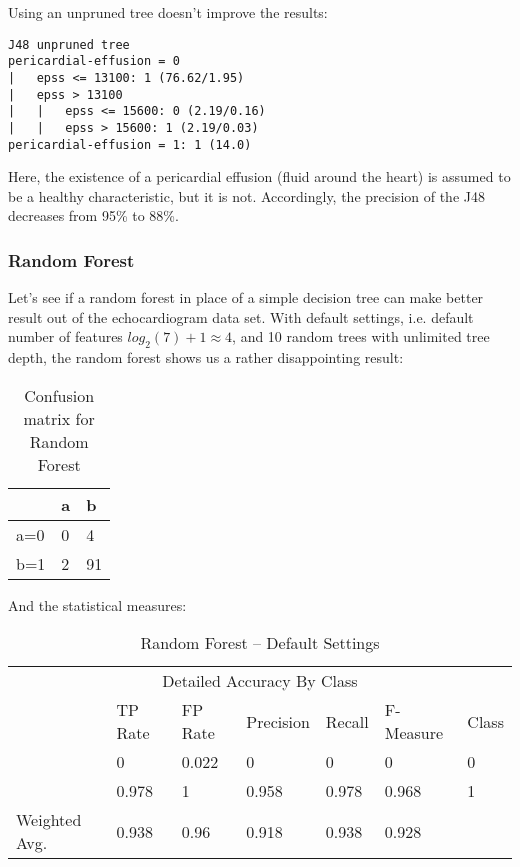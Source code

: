 \documentclass[paper=a4, fontsize=11pt]{scrartcl} %
\numberwithin{equation}{section} %
\numberwithin{figure}{section} %
\numberwithin{table}{section} %
\begin{document}
Using an unpruned tree doesn't improve the results:
\begin{lstlisting}
J48 unpruned tree
pericardial-effusion = 0
|   epss <= 13100: 1 (76.62/1.95)
|   epss > 13100
|   |   epss <= 15600: 0 (2.19/0.16)
|   |   epss > 15600: 1 (2.19/0.03)
pericardial-effusion = 1: 1 (14.0)
\end{lstlisting}
Here, the existence of a pericardial effusion (fluid around the heart) is assumed to be a healthy characteristic, but it is not. Accordingly, the precision of the J48 decreases from 95\% to 88\%.

\subsubsection{Random Forest}
Let's see if a random forest in place of a simple decision tree can make better result out of the echocardiogram data set. With default settings, i.e. default number of features $ log_2(7) + 1 \approx 4 $, and 10 random trees with unlimited tree depth, the random forest shows us a rather disappointing result:
	
\begin{table}[h]
\centering
\begin{tabular}{|l|ll|}
\hline
 & a &	b \\
\hline
a=0 & 0 & 4 \\
b=1 & 2 & 91\\
\hline
\end{tabular}
\caption{Confusion matrix for Random Forest}
\end{table}

And the statistical measures:
\begin{table*}[htb]\centering
    \begin{tabular*}{\columnwidth}{@{}lllllll@{}}
        \toprule 
        \multicolumn{7}{c}{Detailed Accuracy By Class} \\ 
              &  TP Rate & FP Rate & Precision & Recall & F-Measure & Class \\ \midrule
              &  0       & 0.022   & 0         & 0      & 0         & 0     \\
              &  0.978   & 1       & 0.958     & 0.978  & 0.968     & 1     \\
Weighted Avg. &  0.938   & 0.96    & 0.918     & 0.938  & 0.928     &       \\ \bottomrule
    \end{tabular*}
\caption{Random Forest -- Default Settings} 
\end{table*}
\FloatBarrier
\end{document}
